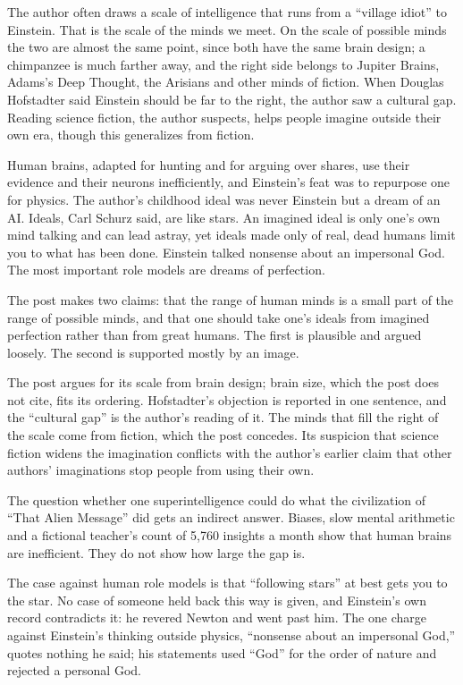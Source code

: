 \begin{afterword}
\summaryhead

The author often draws a scale of intelligence that runs from a ``village idiot'' to Einstein. That is the scale of the minds we meet. On the scale of possible minds the two are almost the same point, since both have the same brain design; a chimpanzee is much farther away, and the right side belongs to Jupiter Brains, Adams's Deep Thought, the Arisians and other minds of fiction. When Douglas Hofstadter said Einstein should be far to the right, the author saw a cultural gap. Reading science fiction, the author suspects, helps people imagine outside their own era, though this generalizes from fiction.

Human brains, adapted for hunting and for arguing over shares, use their evidence and their neurons inefficiently, and Einstein's feat was to repurpose one for physics. The author's childhood ideal was never Einstein but a dream of an AI. Ideals, Carl Schurz said, are like stars. An imagined ideal is only one's own mind talking and can lead astray, yet ideals made only of real, dead humans limit you to what has been done. Einstein talked nonsense about an impersonal God. The most important role models are dreams of perfection.

\responsehead

The post makes two claims: that the range of human minds is a small part of the range of possible minds, and that one should take one's ideals from imagined perfection rather than from great humans. The first is plausible and argued loosely. The second is supported mostly by an image.

The post argues for its scale from brain design; brain size, which the post does not cite, fits its ordering. Hofstadter's objection is reported in one sentence, and the ``cultural gap'' is the author's reading of it. The minds that fill the right of the scale come from fiction, which the post concedes. Its suspicion that science fiction widens the imagination conflicts with the author's earlier claim that other authors' imaginations stop people from using their own.

The question whether one superintelligence could do what the civilization of ``That Alien Message'' did gets an indirect answer. Biases, slow mental arithmetic and a fictional teacher's count of 5,760 insights a month show that human brains are inefficient. They do not show how large the gap is.

The case against human role models is that ``following stars'' at best gets you to the star. No case of someone held back this way is given, and Einstein's own record contradicts it: he revered Newton and went past him. The one charge against Einstein's thinking outside physics, ``nonsense about an impersonal God,'' quotes nothing he said; his statements used ``God'' for the order of nature and rejected a personal God.


\end{afterword}
